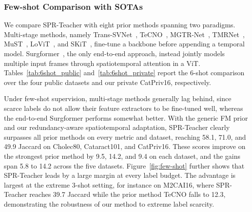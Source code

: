 \subsubsection{Few-shot Comparison with SOTAs}
%
%
%

We compare SPR-Teacher with eight prior methods spanning two paradigms.
Multi-stage methods, namely Trans-SVNet~\cite{gao2021trans},
TeCNO~\cite{czempiel2020tecno}, MGTR-Net~\cite{huang2025multi},
TMRNet~\cite{jin2021temporal}, MuST~\cite{perez2024must}, LoViT~\cite{liu2025lovit},
and SKiT~\cite{liu2023skit}, fine-tune a backbone before appending a temporal
model. Surgformer~\cite{yang2024surgformer}, the only end-to-end approach, instead
jointly models multiple input frames through spatiotemporal attention in a ViT.
Tables~\ref{tab:6shot_public} and~\ref{tab:6shot_private} report the 6-shot
comparison over the four public datasets and our private CatPriv16, respectively.

Under few-shot supervision, multi-stage methods generally lag behind, since scarce
labels do not allow their feature extractors to be fine-tuned well, whereas the
end-to-end Surgformer performs somewhat better. With the generic FM prior and our
redundancy-aware spatiotemporal adaptation, SPR-Teacher clearly
surpasses all prior methods on every metric and dataset, reaching 58.1, 71.0, and
49.9 Jaccard on Cholec80, Cataract101, and CatPriv16. These scores improve on the
strongest prior method by 9.5, 14.2, and 9.4 on each dataset, and the gains span
5.8 to 14.2 across the five datasets. Figure~\ref{fig:few-shot} further shows that
SPR-Teacher leads by a large margin at every label budget. 
The advantage is largest at the extreme 3-shot setting, for instance on M2CAI16,
where SPR-Teacher reaches 39.7 Jaccard while the prior method TeCNO falls to
12.3, demonstrating the robustness of our method to extreme label scarcity.



